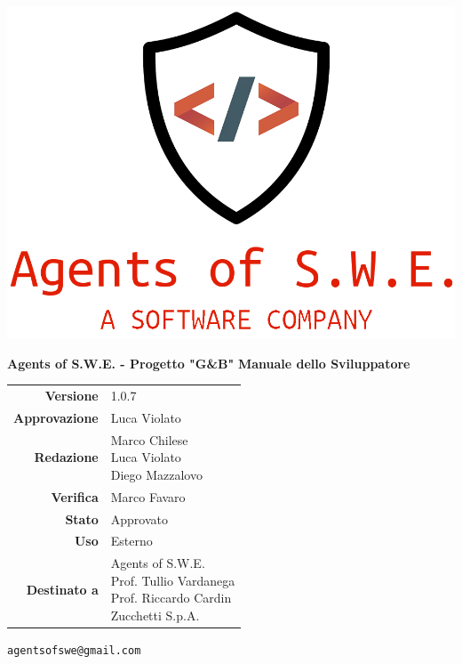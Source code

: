 


\begin{titlepage}
\thispagestyle{empty}

\begin{center}

\includegraphics[scale=0.3]{./images/logo.png} 

\large \textbf{Agents of S.W.E. - Progetto "G\&B"}
\vfill
\Huge \textbf{Manuale dello Sviluppatore}
\vfill
\large
\renewcommand{\arraystretch}{1.3}
\begin{tabular}{r|l}
\textbf{Versione} & 1.0.7\\
\textbf{Approvazione} & Luca Violato \\
\textbf{Redazione} & \parbox[t]{5cm}{Marco Chilese\\Luca Violato\\Diego Mazzalovo}\\
\textbf{Verifica} & \parbox[t]{5cm}{Marco Favaro}\\
\textbf{Stato} & Approvato\\
\textbf{Uso} & Esterno\\
\textbf{Destinato a} & \parbox[t]{5cm}{Agents of S.W.E. \\Prof. Tullio Vardanega\\Prof. Riccardo Cardin \\ Zucchetti S.p.A.}
\end{tabular}
\vfill
\small
\texttt{agentsofswe@gmail.com}
\end{center}
\end{titlepage}

\pagebreak

